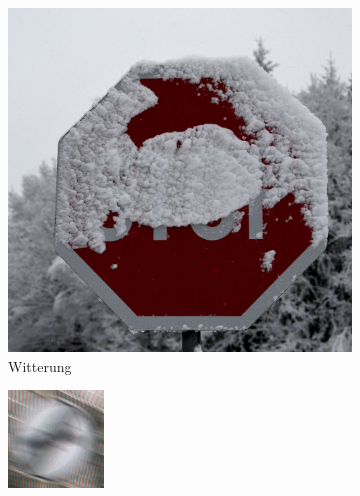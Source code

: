 \begin{figure}[H]
   \centering
   \captionsetup[subfigure]{labelformat=empty}
   \begin{subfigure}[b]{0.125\textwidth}
       \centering
       \includegraphics[height=\textwidth]{../images/Schilder Beispiele/Schnee.jpg}
       \caption{Witterung}
       \label{fig:witterung}
   \end{subfigure}
   \hspace{3em}%
   \begin{subfigure}[b]{0.125\textwidth}
       \centering
       \includegraphics[height=\textwidth]{../images/Schilder Beispiele/MotionBlur.png}

\end{subfigure}
\end{figure}
